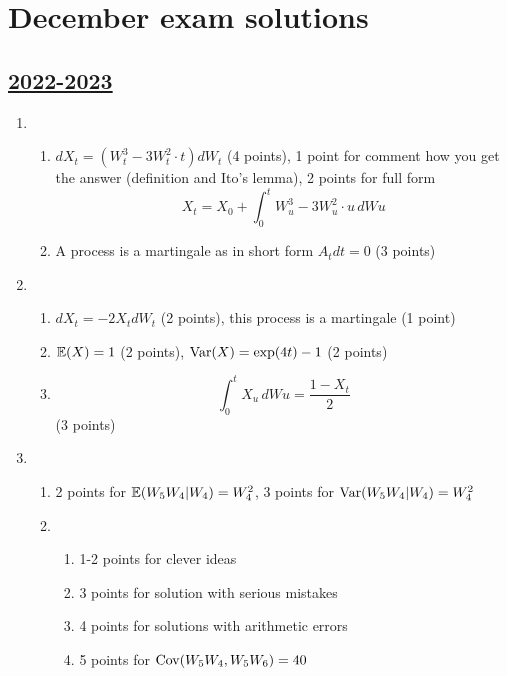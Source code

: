 
\newpage
\thispagestyle{empty}
\section{December exam solutions}
\subsection[2022-2023]{\hyperref[sec:kr_02_2022_2023]{2022-2023}}
\label{sec:sol_kr_02_2022_2023} %

\begin{enumerate}
\item 
\begin{enumerate}
    \item $dX_t = (W^3_t-3W^2_t\cdot t)dW_t$ (4 points), 1 point for comment how you get the answer (definition and Ito's lemma), 2 points for full form 
    \[ X_t = X_0 + \int_{0}^{t} W^3_u-3W^2_u\cdot u \,dWu
    \]
    \item A process is a martingale as in short form $A_t dt =0$ (3 points)
\end{enumerate}

\item 
\begin{enumerate}
    \item $dX_t=-2X_t dW_t$ (2 points), this process is a martingale (1 point)
    \item $\operatorname{\mathbb{E}}(X)=1$ (2 points), $\operatorname{Var}(X)=\exp(4t)-1$ (2 points)
    \item \[ \int_{0}^{t} X_u\,dWu = \frac{1-X_t}{2}\] (3 points)
\end{enumerate}

\item \begin{enumerate}
    \item 2 points for $\operatorname{\mathbb{E}}(W_5 W_4 | W_4) = W_4^2$, 3 points for $\operatorname{Var}(W_5 W_4 | W_4) = W_4^2$
    \item \begin{enumerate}
        \item 1-2 points for clever ideas
        \item 3 points for solution with serious mistakes
        \item 4 points for solutions with arithmetic errors
        \item 5 points for $\operatorname{Cov}(W_5 W_4, W_5 W_6) = 40$
    \end{enumerate}
\end{enumerate}


\end{enumerate}
